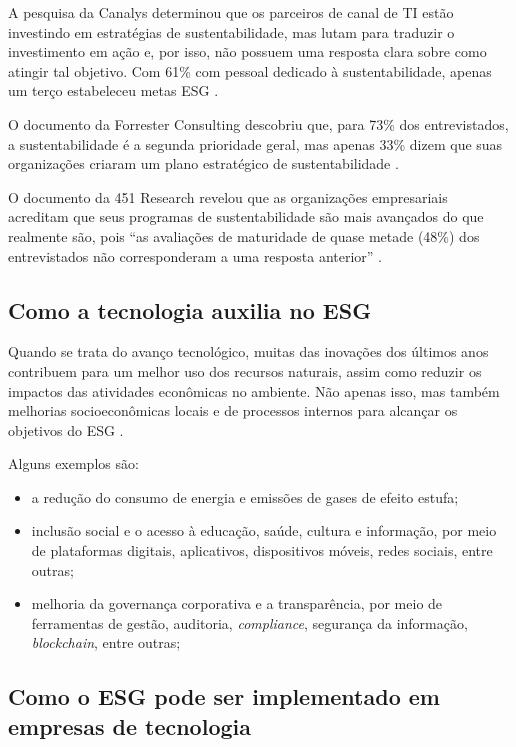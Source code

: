 \documentclass[12pt]{article}
\begin{document}
	A pesquisa da Canalys determinou que os parceiros de canal de TI estão investindo em estratégias de sustentabilidade, mas lutam para traduzir o investimento em ação e, por isso, não possuem uma resposta clara sobre como atingir tal objetivo. Com 61\% com pessoal dedicado à sustentabilidade, apenas um terço estabeleceu metas ESG \cite{paceteESGPrioridadePara2022}.
	
	O documento da Forrester Consulting descobriu que, para 73\% dos entrevistados, a sustentabilidade é a segunda prioridade geral, mas apenas 33\% dizem que suas organizações criaram um plano estratégico de sustentabilidade \cite{paceteESGPrioridadePara2022}.
	
	O documento da 451 Research revelou que as organizações empresariais acreditam que seus programas de sustentabilidade são mais avançados do que realmente são, pois “as avaliações de maturidade de quase metade (48\%) dos entrevistados não corresponderam a uma resposta anterior” \cite{paceteESGPrioridadePara2022}.
	
	\subsection*{Como a tecnologia auxilia no ESG}
	
	Quando se trata do avanço tecnológico, muitas das inovações dos últimos anos contribuem para um melhor uso dos recursos naturais, assim como reduzir os impactos das atividades econômicas no ambiente. Não apenas isso, mas também melhorias socioeconômicas locais e de processos internos para alcançar os objetivos do ESG \cite{cabralPraticasESGAplicadas2023}.
	
	Alguns exemplos são:
	
	\begin{itemize}
		\item a redução do consumo de energia e emissões de gases de efeito estufa;
		\item inclusão social e o acesso à educação, saúde, cultura e informação, por meio de plataformas digitais, aplicativos, dispositivos móveis, redes sociais, entre outras;
		\item melhoria da governança corporativa e a transparência, por meio de ferramentas de gestão, auditoria, \emph{compliance}, segurança da informação, \emph{blockchain}, entre outras;
	\end{itemize}
	
	\subsection*{Como o ESG pode ser implementado em empresas de tecnologia}
	
\end{document}
